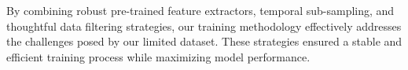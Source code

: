 By combining robust pre-trained feature extractors, temporal sub-sampling, and thoughtful data filtering strategies, our training methodology effectively addresses the challenges posed by our limited dataset. These strategies ensured a stable and efficient training process while maximizing model performance.